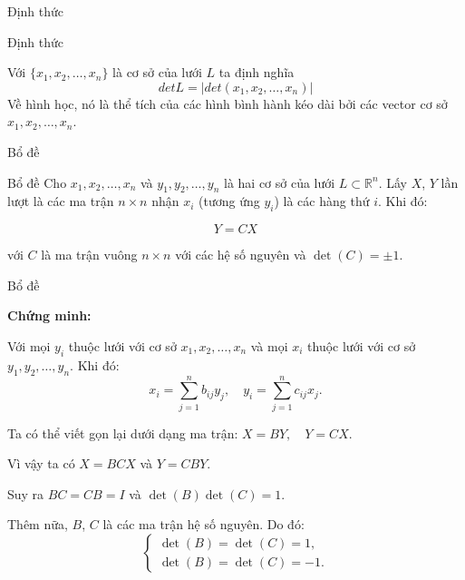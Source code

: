 \begin{frame}{Định thức}
\begin{block}{Định thức}

Với $\{x_1, x_2, \dots, x_n\} $ là cơ sở của lưới $L$ ta định nghĩa $$det L = |det(x_1, x_2, \dots, x_n)|$$
Về hình học, nó là thể tích của các hình bình hành kéo dài bởi các vector cơ sở $x_1, x_2, \dots, x_n$.

\end{block}
\end{frame}
\begin{frame}{Bổ đề}
\begin{block}{Bổ đề}
Cho $x_1, x_2, \ldots, x_n$ và $y_1, y_2, \ldots, y_n$ là hai cơ sở của lưới $L \subset \mathbb{R}^n$.
Lấy $X$, $Y$ lần lượt là các ma trận $n \times n$ nhận $x_i$ (tương ứng $y_i$) là các hàng thứ $i$.
Khi đó:

\begin{equation} \label{equation:bo_de}
Y = CX
\end{equation}

với $C$ là ma trận vuông $n \times n$ với các hệ số nguyên
và $\det(C) = \pm 1$.
\end{block}
\end{frame}
\begin{frame}{Bổ đề}

\textbf{Chứng minh:}

Với mọi $y_i$ thuộc lưới với cơ sở $x_1, x_2, \ldots, x_n$ và mọi $x_i$ thuộc lưới với cơ sở $y_1, y_2, \ldots, y_n$. Khi đó:
\[
x_i = \sum_{j=1}^n b_{ij} y_j, \quad y_i = \sum_{j=1}^n c_{ij} x_j.
\]

Ta có thể viết gọn lại dưới dạng ma trận:
$X = BY, \quad Y = CX.$

Vì vậy ta có $X = BCX$ và $Y = CBY$.


Suy ra $BC = CB = I$ và $\det(B) \det(C) = 1$.

Thêm nữa, $B$, $C$ là các ma trận hệ số nguyên. Do đó:
\[
\begin{cases}
\det(B) = \det(C) = 1, \\
\det(B) = \det(C) = -1.
\end{cases}
\]

\end{frame}

